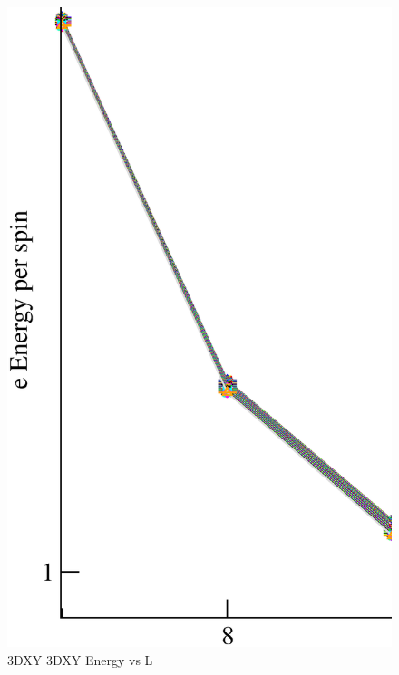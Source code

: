 \begin{figure}[!htpb]
  \centering
  \includegraphics[width=\textwidth]{./plots/3DXY/3DXY_Energy_vs_L.eps}
  \caption{3DXY 3DXY Energy vs L}
\end{figure}


